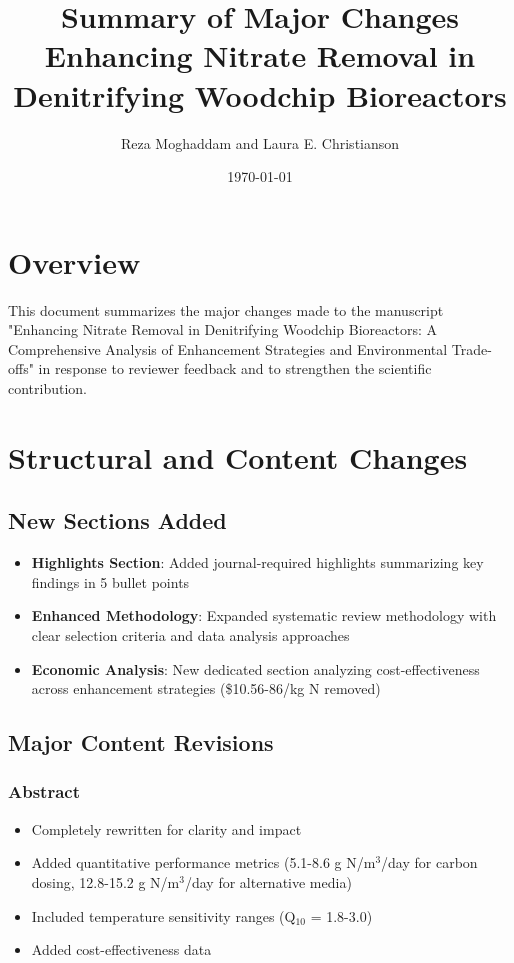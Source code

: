 \documentclass[12pt,a4paper]{article}
\title{Summary of Major Changes\\
\large Enhancing Nitrate Removal in Denitrifying Woodchip Bioreactors}
\author{Reza Moghaddam and Laura E. Christianson}
\date{\today}
\begin{document}
\maketitle

\section*{Overview}

This document summarizes the major changes made to the manuscript "Enhancing Nitrate Removal in Denitrifying Woodchip Bioreactors: A Comprehensive Analysis of Enhancement Strategies and Environmental Trade-offs" in response to reviewer feedback and to strengthen the scientific contribution.

\section{Structural and Content Changes}

\subsection{New Sections Added}

\begin{itemize}[leftmargin=*, itemsep=0.3em]
\item \textbf{Highlights Section}: Added journal-required highlights summarizing key findings in 5 bullet points
\item \textbf{Enhanced Methodology}: Expanded systematic review methodology with clear selection criteria and data analysis approaches
\item \textbf{Economic Analysis}: New dedicated section analyzing cost-effectiveness across enhancement strategies (\$10.56-86/kg N removed)
\end{itemize}

\subsection{Major Content Revisions}

\subsubsection{Abstract}
\begin{itemize}[leftmargin=*, itemsep=0.2em]
\item Completely rewritten for clarity and impact
\item Added quantitative performance metrics (5.1-8.6 g N/m$^3$/day for carbon dosing, 12.8-15.2 g N/m$^3$/day for alternative media)
\item Included temperature sensitivity ranges (Q$_{10}$ = 1.8-3.0)
\item Added cost-effectiveness data
\end{itemize}
\end{document}
